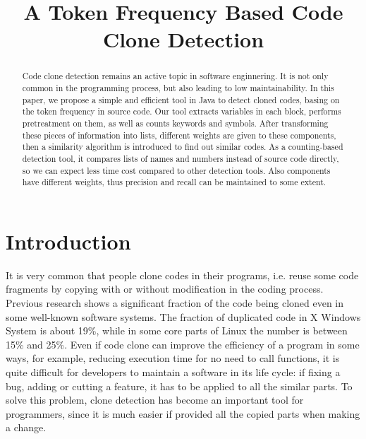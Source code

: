 \documentclass[conference]{IEEEtran}
\begin{document}
\title{A Token Frequency Based Code Clone Detection}

\author{
}

\maketitle


\begin{abstract}
Code clone detection remains an active topic in software enginnering. It is not only common in the programming process, but also leading to low maintainability. 
In this paper, we propose a simple and efficient tool in Java to detect cloned codes, basing on the token frequency in source code. Our tool extracts variables in each block, performs pretreatment on them, as well as counts keywords and symbols. After transforming these pieces of information into lists, different weights are given to these components, then a similarity algorithm is introduced to find out similar codes. 
As a counting-based detection tool, it compares lists of names and numbers instead of source code directly, so we can expect less time cost compared to other detection tools. Also components have different weights, thus precision and recall can be maintained to some extent.
\end{abstract}

\section{Introduction}

It is very common that people clone codes in their programs, i.e. reuse some code fragments by copying with or without modification in the coding process. 
Previous research shows a significant fraction of the code being cloned even in some well-known software systems. The fraction of duplicated code in X Windows System is about 19\%\cite{cloneinsys1}, while in some core parts of Linux the number is between 15\% and 25\%\cite{cloneinsys2}. 
Even if code clone can improve the efficiency of a program in some ways, for example, reducing execution time for no need to call functions, it is quite difficult for developers to maintain a software in its life cycle: if fixing a bug, adding or cutting a feature, it has to be applied to all the similar parts. To solve this problem, clone detection has become an important tool for programmers, since it is much easier if provided all the copied parts when making a change.
\end{document}
